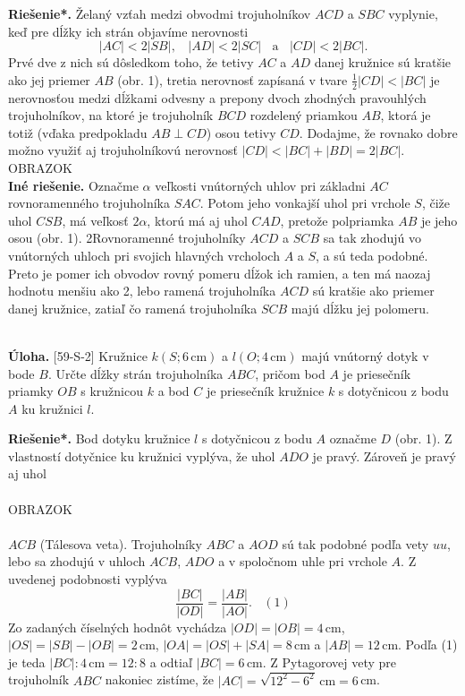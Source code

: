 \documentclass[11pt,a4paper,oneside,final]{book}
\newcommand{\ul}{\textbf{Úloha.} }
\newcommand{\rieh}{\textbf{Riešenie*.} }
\begin{document}
\rieh Želaný vzťah medzi obvodmi trojuholníkov $ACD$ a $SBC$ vyplynie, keď pre dĺžky ich strán objavíme nerovnosti
$$|AC| < 2|SB|,\ \ \ \  |AD| < 2|SC|\ \ \ \  \text{a} \ \ \ \  |CD| < 2|BC|.$$
Prvé dve z nich sú dôsledkom toho, že tetivy $AC$ a $AD$ danej kružnice sú kratšie ako jej priemer $AB$ (obr. 1), tretia nerovnosť zapísaná v tvare $\frac{1}{2}|CD| < |BC|$ je nerovnosťou medzi dĺžkami odvesny a prepony dvoch zhodných pravouhlých trojuholníkov, na ktoré je trojuholník $BCD$ rozdelený priamkou $AB$, ktorá je totiž (vďaka predpokladu $AB \perp CD$) osou tetivy $CD$. Dodajme, že rovnako dobre možno využiť aj trojuholníkovú nerovnosť $|CD| < |BC| + |BD| = 2|BC|$.
\\OBRAZOK\\
\textbf{Iné riešenie.} Označme $\alpha$ veľkosti vnútorných uhlov pri základni $AC$ rovnoramenného trojuholníka $SAC$. Potom jeho vonkajší uhol pri vrchole $S$, čiže uhol $CSB$, má veľkosť $2\alpha$, ktorú má aj uhol $CAD$, pretože polpriamka $AB$ je jeho osou (obr. 1). 2Rovnoramenné trojuholníky $ACD$ a $SCB$ sa tak zhodujú vo vnútorných uhloch pri svojich hlavných vrcholoch $A$ a $S$, a sú teda podobné. Preto je pomer ich obvodov rovný pomeru dĺžok ich ramien, a ten má naozaj hodnotu menšiu ako 2, lebo ramená trojuholníka $ACD$ sú kratšie ako priemer danej kružnice, zatiaľ čo ramená trojuholníka $SCB$ majú dĺžku jej polomeru.\\
\\
\begin{tcolorbox}[breakable,notitle,boxrule=0pt,colback=light-gray,colframe=light-gray]\ul [59-S-2] Kružnice $k(S; 6\,\text{cm})$ a $l(O; 4\,\text{cm})$ majú vnútorný dotyk v bode $B$. Určte dĺžky strán trojuholníka $ABC$, pričom bod $A$ je priesečník priamky $OB$ s kružnicou $k$ a bod $C$ je priesečník kružnice $k$ s dotyčnicou z bodu $A$ ku kružnici $l$.

\end{tcolorbox}

\rieh Bod dotyku kružnice $l$ s dotyčnicou z bodu $A$ označme $D$ (obr. 1). Z vlastností dotyčnice ku kružnici vyplýva, že uhol $ADO$ je pravý. Zároveň je pravý aj uhol
\\
\\
OBRAZOK
\\
\\
$ACB$ (Tálesova veta). Trojuholníky $ABC$ a $AOD$ sú tak podobné podľa vety $uu$, lebo sa zhodujú v uhloch $ACB$, $ADO$ a v spoločnom uhle pri vrchole $A$. Z uvedenej podobnosti vyplýva
$$\frac{|BC|}{|OD|}=\frac{|AB|}{|AO|}. \ \ \ \  (1)$$
Zo zadaných číselných hodnôt vychádza $|OD| = |OB| = 4$\,cm, $|OS| = |SB| - |OB| = 2$\,cm, $|OA| = |OS| + |SA| = 8$\,cm a $|AB| = 12$\,cm. Podľa (1) je teda $|BC| : 4\,\text{cm} = 12 : 8$ a odtiaľ $|BC| = 6$\,cm. Z Pytagorovej vety pre trojuholník $ABC$ nakoniec zistíme, že $|AC| = \sqrt{12^2 - 6^2}\,\text{cm}= 6$\,cm.\\
\\
\end{document}
